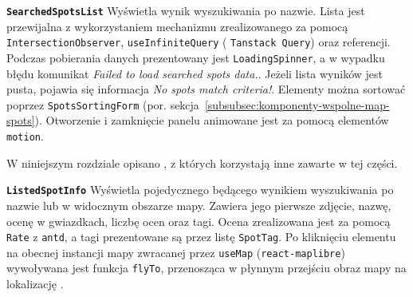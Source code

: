 \textbf{\texttt{SearchedSpotsList}}
Wyświetla wynik wyszukiwania  po nazwie.
Lista jest przewijalna z wykorzystaniem mechanizmu  zrealizowanego
za pomocą \texttt{IntersectionObserver},  \texttt{useInfiniteQuery} (
\texttt{Tanstack Query}) oraz referencji.
Podczas pobierania danych prezentowany jest \texttt{LoadingSpinner}, a w wypadku błędu komunikat \emph{Failed to load searched spots data.}.
Jeżeli lista wyników jest pusta, pojawia się informacja \emph{No spots match criteria!}.
Elementy można sortować poprzez  \texttt{SpotsSortingForm}
(por. sekcja~\ref{subsubsec:komponenty-wspolne-map-spots}).
Otworzenie i zamknięcie panelu animowane jest za pomocą elementów  \texttt{motion}.

\label{subsubsec:komponenty-wspolne-map-spots}

W niniejszym rozdziale opisano , z których korzystają inne 
zawarte w tej części.

\textbf{\texttt{ListedSpotInfo}}
Wyświetla pojedycznego  będącego wynikiem wyszukiwania po nazwie lub w widocznym obszarze mapy.
Zawiera jego pierwsze zdjęcie, nazwę, ocenę w gwiazdkach, liczbę ocen oraz tagi.
Ocena zrealizowana jest za pomocą \texttt{Rate} z  \texttt{antd}, a
tagi prezentowane są przez listę \texttt{SpotTag}.
Po kliknięciu elementu na obecnej instancji mapy zwracanej przez  \texttt{useMap} (\texttt{react-maplibre})
wywoływana jest funkcja \texttt{flyTo}, przenosząca w płynnym przejściu obraz mapy na lokalizację .

